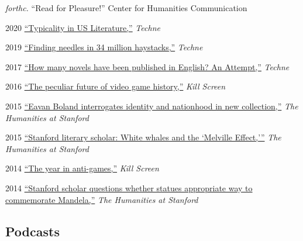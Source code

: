 \documentclass[12pt,letterpaper]{report}
\begin{document}
\begin{tablist}
	\item[\emph{forthc.}] \tab{}\enquote{Read for Pleasure!} Center for Humanities Communication
	\item[2020] \tab{}\href{https://web.archive.org/web/20220430165427/https://litlab.stanford.edu/typicality-in-the-u-s-novel/}{\enquote{Typicality in US Literature,}} \emph{Techne}
	\item[2019] \tab{}\href{https://web.archive.org/web/20220430054802/https://litlab.stanford.edu/finding-needles-in-34-million-haystacks/}{\enquote{Finding needles in 34 million haystacks,}} \emph{Techne}
	\item[2017] \tab{}\href{https://web.archive.org/web/20220323072937/https://litlab.stanford.edu/how-many-novels-have-been-published-in-english-an-attempt/}{\enquote{How many novels have been published in English? An Attempt,}} \emph{Techne}
	\item[2016] \tab{}\href{https://web.archive.org/web/20230328175329/https://killscreen.com/previously/articles/the-peculiar-future-of-videogame-history/}{\enquote{The peculiar future of video game history,}} \emph{Kill Screen}
	\item[2015] \tab{}\href{https://web.archive.org/web/20210810123746/https://news.stanford.edu/news/2015/february/boland-country-book-022615.html}{\enquote{Eavan Boland interrogates identity and nationhood in new collection,}} \emph{The Humanities at Stanford}
	\item[2015] \tab{}\href{https://web.archive.org/web/20210810125202/https://news.stanford.edu/news/2015/may/melville-scholar-boone-051115.html}{\enquote{Stanford literary scholar: White whales and the \enquote{Melville Effect,}}} \emph{The Humanities at Stanford}
	\item[2014] \tab{} \href{https://web.archive.org/web/20231028015401/https://killscreen.com/previously/articles/year-anti-games/}{\enquote{The year in anti-games,}}
	\emph{Kill Screen}
	\item[2014] \tab{}\href{https://web.archive.org/web/20220611230152/https://news.stanford.edu/pr/2014/pr-mandela-statue-parker-120314.html}{\enquote{Stanford scholar questions whether statues appropriate way to commemorate Mandela,}} \emph{The Humanities at Stanford}
\end{tablist}

\subsection*{Podcasts}
\end{document}

